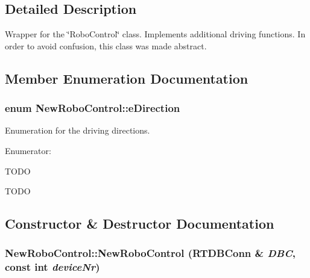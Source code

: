 \subsection{Detailed Description}
Wrapper for the \char`\"{}RoboControl\char`\"{} class. Implements additional driving functions. In order to avoid confusion, this class was made abstract. 

\subsection{Member Enumeration Documentation}
\hypertarget{classNewRoboControl_a077fa253b827c190e82c1ce1e4c8d18f}{
\subsubsection[{eDirection}]{\setlength{\rightskip}{0pt plus 5cm}enum {\bf NewRoboControl::eDirection}}}
\label{classNewRoboControl_a077fa253b827c190e82c1ce1e4c8d18f}


Enumeration for the driving directions. 

\begin{Desc}
\item[Enumerator: ]\par
\begin{description}
\item[{\em 
\hypertarget{classNewRoboControl_a077fa253b827c190e82c1ce1e4c8d18fac7af9b70b7504bd260f486172de934d9}{
FORWARD}
\label{classNewRoboControl_a077fa253b827c190e82c1ce1e4c8d18fac7af9b70b7504bd260f486172de934d9}
}]TODO \item[{\em 
\hypertarget{classNewRoboControl_a077fa253b827c190e82c1ce1e4c8d18faa55a679c9e8fbc7400c88ce3cab09c48}{
BACKWARD}
\label{classNewRoboControl_a077fa253b827c190e82c1ce1e4c8d18faa55a679c9e8fbc7400c88ce3cab09c48}
}]TODO \end{description}
\end{Desc}



\subsection{Constructor \& Destructor Documentation}
\hypertarget{classNewRoboControl_a81f7ad52f88ea8fb90eeff5650efa1c5}{
\subsubsection[{NewRoboControl}]{\setlength{\rightskip}{0pt plus 5cm}NewRoboControl::NewRoboControl (RTDBConn \& {\em DBC}, \/  const int {\em deviceNr})}}
\label{classNewRoboControl_a81f7ad52f88ea8fb90eeff5650efa1c5}

